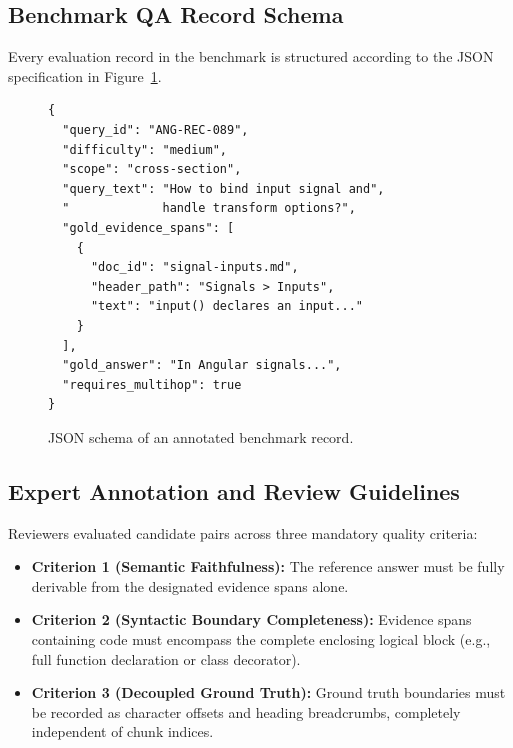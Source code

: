 \subsection{Benchmark QA Record Schema}
Every evaluation record in the benchmark is structured according to the JSON specification in Figure~\ref{fig:dataset_schema}.

\begin{figure}[h]
\centering
\footnotesize
\begin{minipage}{0.95\columnwidth}
\begin{verbatim}
{
  "query_id": "ANG-REC-089",
  "difficulty": "medium",
  "scope": "cross-section",
  "query_text": "How to bind input signal and",
  "             handle transform options?",
  "gold_evidence_spans": [
    {
      "doc_id": "signal-inputs.md",
      "header_path": "Signals > Inputs",
      "text": "input() declares an input..."
    }
  ],
  "gold_answer": "In Angular signals...",
  "requires_multihop": true
}
\end{verbatim}
\end{minipage}
\caption{JSON schema of an annotated benchmark record.}
\label{fig:dataset_schema}
\end{figure}

\subsection{Expert Annotation and Review Guidelines}
Reviewers evaluated candidate pairs across three mandatory quality criteria:
\begin{itemize}
    \item \textbf{Criterion 1 (Semantic Faithfulness):} The reference answer must be fully derivable from the designated evidence spans alone.
    \item \textbf{Criterion 2 (Syntactic Boundary Completeness):} Evidence spans containing code must encompass the complete enclosing logical block (e.g., full function declaration or class decorator).
    \item \textbf{Criterion 3 (Decoupled Ground Truth):} Ground truth boundaries must be recorded as character offsets and heading breadcrumbs, completely independent of chunk indices.
\end{itemize}

